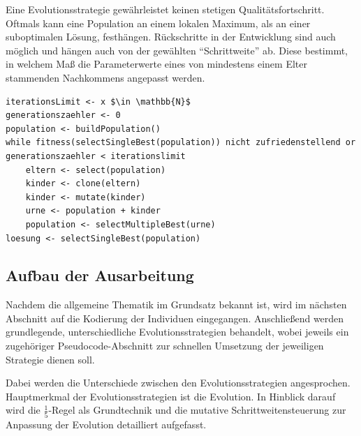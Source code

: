 Eine Evolutionsstrategie gewährleistet keinen stetigen Qualitätsfortschritt. Oftmals kann eine Population an einem lokalen Maximum, als an einer suboptimalen Lösung, festhängen. Rückschritte in der Entwicklung sind auch möglich und hängen auch von der gewählten \enquote{Schrittweite} ab. Diese bestimmt, in welchem Maß die Parameterwerte eines von mindestens einem Elter stammenden Nachkommens angepasst werden.

\setlistingtopseudocode

\begin{lstlisting}[caption=Grundlegende Evolutionsstrategien, firstnumber=1, captionpos=b, label=code:standard_es]
iterationsLimit <- x $\in \mathbb{N}$
generationszaehler <- 0
population <- buildPopulation()
while fitness(selectSingleBest(population)) nicht zufriedenstellend or generationszaehler < iterationslimit
	eltern <- select(population)
	kinder <- clone(eltern)
	kinder <- mutate(kinder)
	urne <- population + kinder
	population <- selectMultipleBest(urne)
loesung <- selectSingleBest(population)
\end{lstlisting}

\subsection{Aufbau der Ausarbeitung}

Nachdem die allgemeine Thematik im Grundsatz bekannt ist, wird im nächsten Abschnitt auf die Kodierung der Individuen eingegangen. Anschließend werden grundlegende, unterschiedliche Evolutionsstrategien behandelt, wobei jeweils ein zugehöriger Pseudocode-Abschnitt zur schnellen Umsetzung der jeweiligen Strategie dienen soll.

Dabei werden die Unterschiede zwischen den Evolutionsstrategien angesprochen. Hauptmerkmal der Evolutionsstrategien ist die Evolution. In Hinblick darauf wird die $\frac{1}{5}$-Regel als Grundtechnik und die mutative Schrittweitensteuerung zur Anpassung der Evolution detailliert aufgefasst.


